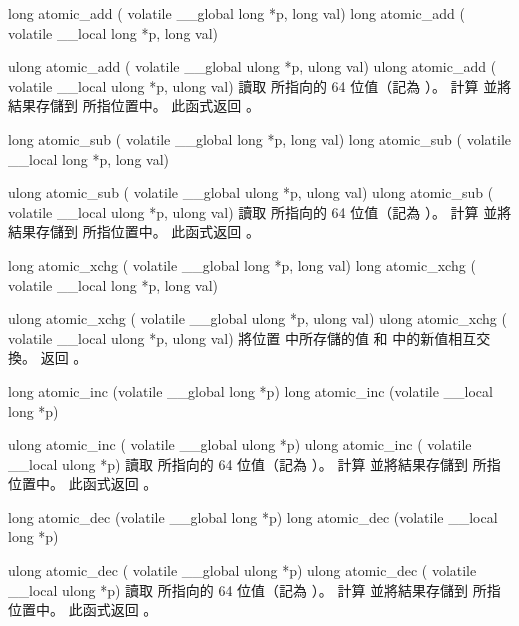 long atomic_add (
	volatile __global long *p,
	long val)
long atomic_add (
	volatile __local long *p,
	long val)

ulong atomic_add (
	volatile __global ulong *p,
	ulong val)
ulong atomic_add (
	volatile __local ulong *p,
	ulong val)
\stopbuffer
{}
讀取  所指向的 64 位值（記為 ）。
計算  並將結果存儲到  所指位置中。
此函式返回 。
\stopbuffer

long atomic_sub (
	volatile __global long *p,
	long val)
long atomic_sub (
	volatile __local long *p,
	long val)

ulong atomic_sub (
	volatile __global ulong *p,
	ulong val)
ulong atomic_sub (
	volatile __local ulong *p,
	ulong val)
\stopbuffer
{}
讀取  所指向的 64 位值（記為 ）。
計算  並將結果存儲到  所指位置中。
此函式返回 。
\stopbuffer

long atomic_xchg (
	volatile __global long *p,
	long val)
long atomic_xchg (
	volatile __local long *p,
	long val)

ulong atomic_xchg (
	volatile __global ulong *p,
	ulong val)
ulong atomic_xchg (
	volatile __local ulong *p,
	ulong val)
\stopbuffer
{}
將位置  中所存儲的值  和  中的新值相互交換。
返回 。
\stopbuffer

long atomic_inc (volatile __global long *p)
long atomic_inc (volatile __local long *p)

ulong atomic_inc (
	volatile __global ulong *p)
ulong atomic_inc (
	volatile __local ulong *p)
\stopbuffer
{}
讀取  所指向的 64 位值（記為 ）。
計算  並將結果存儲到  所指位置中。
此函式返回 。
\stopbuffer

long atomic_dec (volatile __global long *p)
long atomic_dec (volatile __local long *p)

ulong atomic_dec (
	volatile __global ulong *p)
ulong atomic_dec (
	volatile __local ulong *p)
\stopbuffer
{}
讀取  所指向的 64 位值（記為 ）。
計算  並將結果存儲到  所指位置中。
此函式返回 。
\stopbuffer

